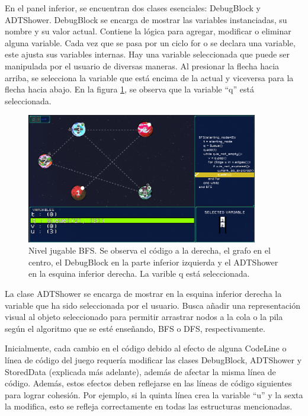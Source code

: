 En el panel inferior, se encuentran dos clases esenciales: DebugBlock y ADTShower. DebugBlock se encarga de mostrar las variables instanciadas, su nombre y su valor actual. Contiene la lógica para agregar, modificar o eliminar alguna variable. Cada vez que se pasa por un ciclo for o se declara una variable, este ajusta sus variables internas. Hay una variable seleccionada que puede ser manipulada por el usuario de diversas maneras. Al presionar la flecha hacia arriba, se selecciona la variable que está encima de la actual y viceversa para la flecha hacia abajo. En la figura \ref{BFSFullGame}, se observa que la variable ``q'' está seleccionada.

\begin{figure}[h]
	\centering
	\includegraphics[width=0.9\textwidth]{imagenes/BFSFullGame.png}
	\caption{Nivel jugable BFS. Se observa el código a la derecha, el grafo en el centro, el DebugBlock en la parte inferior izquierda y el ADTShower en la esquina inferior derecha. La varible q está seleccionada.}
	\label{BFSFullGame}
\end{figure}

La clase ADTShower se encarga de mostrar en la esquina inferior derecha la variable que ha sido seleccionada por el usuario. Busca añadir una representación visual al objeto seleccionado para permitir arrastrar nodos a la cola o la pila según el algoritmo que se esté enseñando, BFS o DFS, respectivamente.

Inicialmente, cada cambio en el código debido al efecto de alguna CodeLine o línea de código del juego requería modificar las clases DebugBlock, ADTShower y StoredData (explicada más adelante), además de afectar la misma línea de código. Además, estos efectos deben reflejarse en las líneas de código siguientes para lograr cohesión. Por ejemplo, si la quinta línea crea la variable ``u'' y la sexta la modifica, esto se refleja correctamente en todas las estructuras mencionadas.

